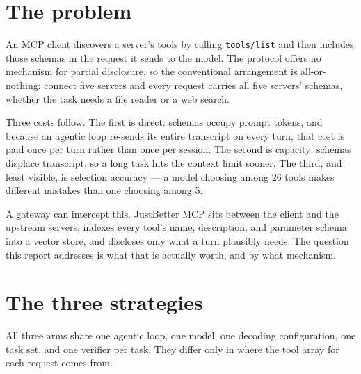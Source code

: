 \documentclass[11pt,a4paper]{article}
\begin{document}
\section{The problem}

An MCP client discovers a server's tools by calling \texttt{tools/list} and then includes those
schemas in the request it sends to the model. The protocol offers no mechanism for partial
disclosure, so the conventional arrangement is all-or-nothing: connect five servers and every
request carries all five servers' schemas, whether the task needs a file reader or a web search.

Three costs follow. The first is direct: schemas occupy prompt tokens, and because an agentic loop
re-sends its entire transcript on every turn, that cost is paid once per turn rather than once per
session. The second is capacity: schemas displace transcript, so a long task hits the context limit
sooner. The third, and least visible, is selection accuracy --- a model choosing among 26 tools
makes different mistakes than one choosing among 5.

A gateway can intercept this. JustBetter MCP sits between the client and the upstream servers,
indexes every tool's name, description, and parameter schema into a vector store, and discloses only
what a turn plausibly needs. The question this report addresses is what that is actually worth, and
by what mechanism.

\section{The three strategies}

All three arms share one agentic loop, one model, one decoding configuration, one task set, and one
verifier per task. They differ only in where the tool array for each request comes from.
\end{document}
